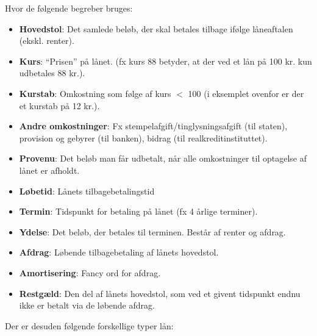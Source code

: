 \documentclass[10pt,reqno, usenames]{article}
\begin{document}
Hvor de følgende begreber bruges: 

\begin{itemize}
    \item \textbf{Hovedstol}: Det samlede beløb, der skal betales tilbage ifølge låneaftalen (ekskl. renter).
    \item \textbf{Kurs}: ``Prisen'' på lånet. (fx kurs 88 betyder, at der ved et lån på 100 kr. kun udbetales 88 kr.).
    \item \textbf{Kurstab}: Omkostning som følge af kurs $<$ 100 (i eksemplet ovenfor er der et kurstab på 12 kr.).
    \item \textbf{Andre omkostninger}: Fx stempelafgift/tinglysningsafgift (til staten), provision og gebyrer (til banken), bidrag (til realkreditinstituttet).
    \item \textbf{Provenu}: Det beløb man får udbetalt, når alle omkostninger til optagelse af lånet er afholdt.
    \item \textbf{Løbetid}: Lånets tilbagebetalingstid
    \item \textbf{Termin}: Tidspunkt for betaling på lånet (fx 4 årlige terminer).
    \item \textbf{Ydelse}: Det beløb, der betales til terminen. Består af renter og afdrag.
    \item \textbf{Afdrag}: Løbende tilbagebetaling af lånets hovedstol.
    \item \textbf{Amortisering}: Fancy ord for afdrag.
    \item \textbf{Restgæld}: Den del af lånets hovedstol, som ved et givent tidspunkt endnu ikke er betalt via de løbende afdrag.
\end{itemize}

Der er desuden følgende forskellige typer lån: 
\end{document}
